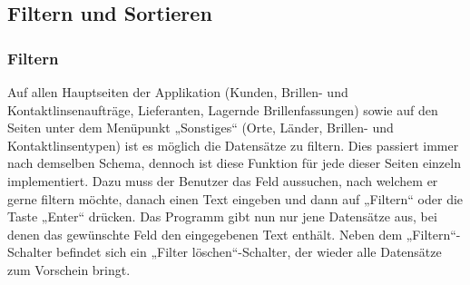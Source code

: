 \subsection{Filtern und Sortieren}
\subsubsection{Filtern}
Auf allen Hauptseiten der Applikation (Kunden, Brillen- und Kontaktlinsenaufträge, Lieferanten, Lagernde Brillenfassungen) sowie auf den Seiten unter dem Menüpunkt „Sonstiges“ (Orte, Länder, Brillen- und Kontaktlinsentypen) ist es möglich die Datensätze zu filtern. Dies passiert immer nach demselben Schema, dennoch ist diese Funktion für jede dieser Seiten einzeln implementiert.
Dazu muss der Benutzer das Feld aussuchen, nach welchem er gerne filtern möchte, danach einen Text eingeben und dann auf „Filtern“  oder die Taste „Enter“ drücken. Das Programm gibt nun nur jene Datensätze aus, bei denen das gewünschte Feld den eingegebenen Text enthält. Neben dem „Filtern“-Schalter befindet sich ein „Filter löschen“-Schalter, der wieder alle Datensätze zum Vorschein bringt.

